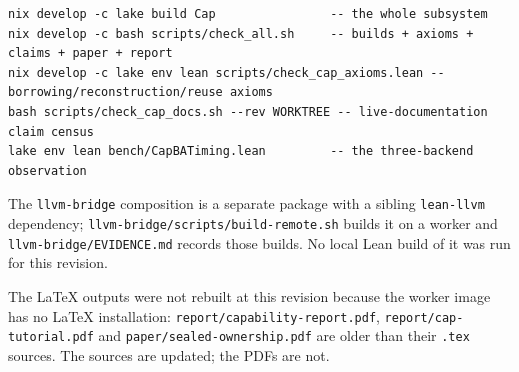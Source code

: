 \documentclass[10pt,a4paper]{article}
\newcommand{\file}[1]{\texttt{#1}}
\begin{document}
\begin{lstlisting}[language={},frame=none,backgroundcolor=\color{shade}]
nix develop -c lake build Cap                -- the whole subsystem
nix develop -c bash scripts/check_all.sh     -- builds + axioms + claims + paper + report
nix develop -c lake env lean scripts/check_cap_axioms.lean -- borrowing/reconstruction/reuse axioms
bash scripts/check_cap_docs.sh --rev WORKTREE -- live-documentation claim census
lake env lean bench/CapBATiming.lean         -- the three-backend observation
\end{lstlisting}

The \file{llvm-bridge} composition is a separate package with a sibling
\file{lean-llvm} dependency; \file{llvm-bridge/scripts/build-remote.sh} builds it
on a worker and \file{llvm-bridge/EVIDENCE.md} records those builds. No local
Lean build of it was run for this revision.

The LaTeX outputs were not rebuilt at this revision because the worker image has
no LaTeX installation: \file{report/capability-report.pdf},
\file{report/cap-tutorial.pdf} and \file{paper/sealed-ownership.pdf} are older
than their \file{.tex} sources. The sources are updated; the PDFs are not.
\end{document}
